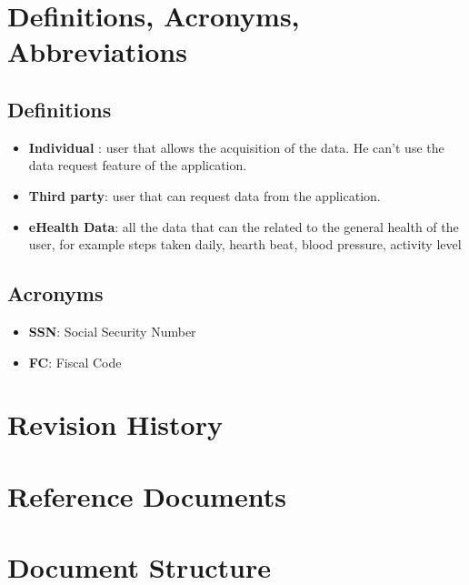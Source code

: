 \section{Definitions, Acronyms, Abbreviations}
\subsection{Definitions}
\begin{itemize}
\item \textbf{Individual} : user that allows the acquisition of the data. He can't use the data request feature of the application.
\item \textbf{Third party}: user that can request data from the application.
\item \textbf{eHealth Data}: all the data that can the related to the general health of the user, for example steps taken daily, hearth beat, blood pressure, activity level
\end{itemize}




\subsection{Acronyms}

\begin{itemize}
\item \textbf{SSN}: Social Security Number
\item \textbf{FC}: Fiscal Code
\end{itemize}




\section{Revision History}
\section{Reference Documents}
\section{Document Structure}